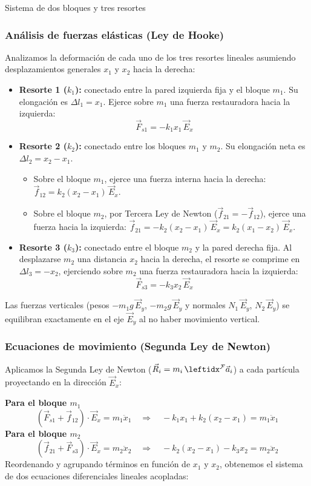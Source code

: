 \begin{solucion}{Sistema de dos bloques y tres resortes}
\subsubsection*{Análisis de fuerzas elásticas (Ley de Hooke)}
Analizamos la deformación de cada uno de los tres resortes lineales asumiendo desplazamientos generales $x_1$ y $x_2$ hacia la derecha:
\begin{itemize}
    \item \textbf{Resorte 1 ($k_1$):} conectado entre la pared izquierda fija y el bloque $m_1$. Su elongación es $\Delta l_1 = x_1$. Ejerce sobre $m_1$ una fuerza restauradora hacia la izquierda:
    $$\vec{F}_{s1} = -k_1 x_1\,\vec{E}_x$$
    \item \textbf{Resorte 2 ($k_2$):} conectado entre los bloques $m_1$ y $m_2$. Su elongación neta es $\Delta l_2 = x_2 - x_1$.
    \begin{itemize}
        \item Sobre el bloque $m_1$, ejerce una fuerza interna hacia la derecha: $\vec{f}_{12} = k_2(x_2 - x_1)\,\vec{E}_x$.
        \item Sobre el bloque $m_2$, por Tercera Ley de Newton ($\vec{f}_{21} = -\vec{f}_{12}$), ejerce una fuerza hacia la izquierda: $\vec{f}_{21} = -k_2(x_2 - x_1)\,\vec{E}_x = k_2(x_1 - x_2)\,\vec{E}_x$.
    \end{itemize}
    \item \textbf{Resorte 3 ($k_3$):} conectado entre el bloque $m_2$ y la pared derecha fija. Al desplazarse $m_2$ una distancia $x_2$ hacia la derecha, el resorte se comprime en $\Delta l_3 = -x_2$, ejerciendo sobre $m_2$ una fuerza restauradora hacia la izquierda:
    $$\vec{F}_{s3} = -k_3 x_2\,\vec{E}_x$$
\end{itemize}
Las fuerzas verticales (pesos $-m_1 g\,\vec{E}_y$, $-m_2 g\,\vec{E}_y$ y normales $N_1\,\vec{E}_y$, $N_2\,\vec{E}_y$) se equilibran exactamente en el eje $\vec{E}_y$ al no haber movimiento vertical.

\subsubsection*{Ecuaciones de movimiento (Segunda Ley de Newton)}
Aplicamos la Segunda Ley de Newton ($\vec{R}_i = m_i\,\marc{\vec{a}_i}{F}{}$) a cada partícula proyectando en la dirección $\vec{E}_x$:

\textbf{Para el bloque $m_1$}
$$\left(\vec{F}_{s1} + \vec{f}_{12}\right) \cdot \vec{E}_x = m_1 \ddot{x}_1 \quad\Longrightarrow\quad -k_1 x_1 + k_2(x_2 - x_1) = m_1 \ddot{x}_1$$
\textbf{Para el bloque $m_2$}
$$\left(\vec{f}_{21} + \vec{F}_{s3}\right) \cdot \vec{E}_x = m_2 \ddot{x}_2 \quad\Longrightarrow\quad -k_2(x_2 - x_1) - k_3 x_2 = m_2 \ddot{x}_2$$
Reordenando y agrupando términos en función de $x_1$ y $x_2$, obtenemos el sistema de dos ecuaciones diferenciales lineales acopladas:


\end{solucion}
